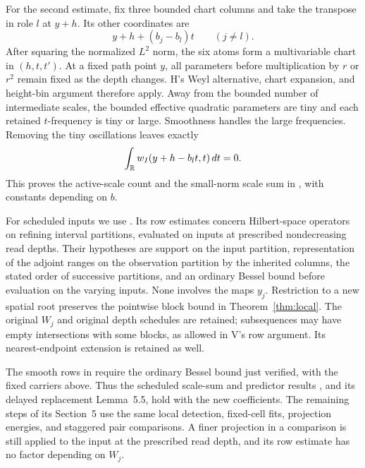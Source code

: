 For the second estimate, fix three bounded chart columns and take
the transpose in role \(l\) at \(y+h\).  Its other coordinates are
\[
 y+h+(b_j-b_l)t\qquad(j\ne l).
\]
After squaring the normalized \(L^2\) norm, the six atoms form a
multivariable chart in \((h,t,t')\).  At a fixed path point \(y\),
all parameters before multiplication by \(r\) or \(r^2\) remain
fixed as the depth changes.  H's Weyl alternative, chart expansion,
and height-bin argument therefore apply.  Away from the bounded
number of intermediate scales, the bounded effective quadratic
parameters are tiny and each retained \(t\)-frequency is tiny or
large.  Smoothness handles the large frequencies.  Removing the tiny
oscillations leaves exactly
\[
 \int_\mathbb R w_I(y+h-b_lt,t)\,dt=0.
\]
This proves the active-scale count and the small-norm scale sum in
\cite[Lemma~5.7]{H}, with constants depending on \(b\).

For scheduled inputs we use \cite[Section~4]{V}.  Its row estimates
concern Hilbert-space operators on refining interval partitions,
evaluated on inputs at prescribed nondecreasing read depths.  Their
hypotheses are support on the input partition, representation of the
adjoint ranges on the observation partition by the inherited columns,
the stated order of successive partitions, and an ordinary Bessel
bound before evaluation on the varying inputs.  None involves the
maps \(y_j\).  Restriction to a new spatial root preserves the
pointwise block bound in Theorem~\ref{thm:local}.  The original
\(W_j\) and original depth schedules are retained; subsequences may
have empty intersections with some blocks, as allowed in V's row
argument.  Its nearest-endpoint extension is retained as well.

The smooth rows in \cite[Lemma~4.6]{V} require the ordinary Bessel
bound just verified, with the fixed carriers above.  Thus the
scheduled scale-sum and predictor results
\cite[Lemma~5.3 and Corollary~5.4]{V}, and its delayed replacement
Lemma~5.5, hold with the new coefficients.  The remaining steps of
its Section~5 use the same local detection, fixed-cell fits,
projection energies, and staggered pair comparisons.  A finer
projection in a comparison is still applied to the input at the
prescribed read depth, and its row estimate has no factor depending
on \(W_j\).


